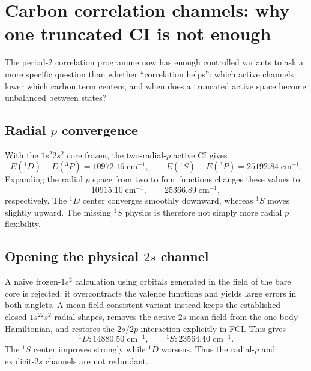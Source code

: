 \section{Carbon correlation channels: why one truncated CI is not enough}
\label{sec:carbon-correlation-channels}

The period-2 correlation programme now has enough controlled variants to ask a more specific question than whether ``correlation helps'': which active channels lower which carbon term centers, and when does a truncated active space become unbalanced between states?

\subsection{Radial $p$ convergence}
With the $1s^2 2s^2$ core frozen, the two-radial-$p$ active CI gives
\begin{equation}
E(^1D)-E(^3P)=10972.16\;\mathrm{cm^{-1}},\qquad
E(^1S)-E(^3P)=25192.84\;\mathrm{cm^{-1}}.
\end{equation}
Expanding the radial $p$ space from two to four functions changes these values to
\begin{equation}
10915.10\;\mathrm{cm^{-1}},\qquad 25366.89\;\mathrm{cm^{-1}},
\end{equation}
respectively.  The $^1D$ center converges smoothly downward, whereas $^1S$ moves slightly upward.  The missing $^1S$ physics is therefore not simply more radial $p$ flexibility.

\subsection{Opening the physical $2s$ channel}
A naive frozen-$1s^2$ calculation using orbitals generated in the field of the bare core is rejected: it overcontracts the valence functions and yields large errors in both singlets.  A mean-field-consistent variant instead keeps the established closed-$1s^22s^2$ radial shapes, removes the active-$2s$ mean field from the one-body Hamiltonian, and restores the $2s/2p$ interaction explicitly in FCI.  This gives
\begin{equation}
^1D:14880.50\;\mathrm{cm^{-1}},\qquad
^1S:23564.40\;\mathrm{cm^{-1}}.
\end{equation}
The $^1S$ center improves strongly while $^1D$ worsens.  Thus the radial-$p$ and explicit-$2s$ channels are not redundant.

